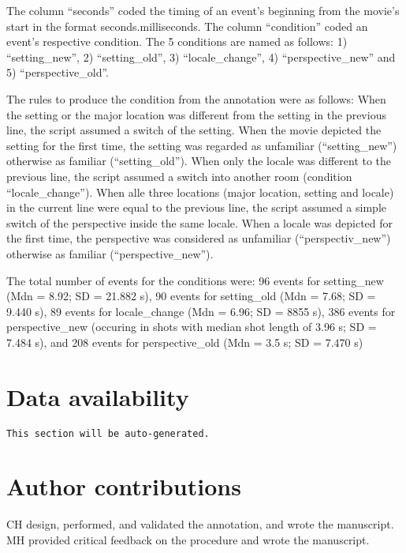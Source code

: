 \documentclass[10pt,a4paper,twocolumn]{article}
\begin{document}
The column ``seconds'' coded the timing of an event's beginning
from the movie's start in the format seconds.milliseconds. The column
``condition'' coded an event's respective condition. The 5 conditions
are named as follows: 1) ``setting\_new'', 2) ``setting\_old'',
3) ``locale\_change'', 4) ``perspective\_new'' and 5) ``perspective\_old''. 

The rules to produce the condition from the annotation were as follows:
When the setting or the major location was different from the setting
in the previous line, the script assumed a switch of the setting.
When the movie depicted the setting for the first time, the setting
was regarded as unfamiliar (``setting\_new'') otherwise as familiar
(``setting\_old''). When only the locale was different to the previous
line, the script assumed a switch into another room (condition ``locale\_change'').
When alle three locations (major location, setting and locale) in
the current line were equal to the previous line, the script assumed
a simple switch of the perspective inside the same locale. When a
locale was depicted for the first time, the perspective was considered
as unfamiliar (``perspectiv\_new'') otherwise as familiar (``perspective\_new''). 

The total number of events for the conditions were: 96 events for
setting\_new (Mdn = 8.92; SD = 21.882 s), 90 events for setting\_old
(Mdn = 7.68; SD = 9.440 s), 89 events for locale\_change (Mdn = 6.96;
SD = 8855 s), 386 events for perspective\_new (occuring in shots with
median shot length of 3.96 s; SD = 7.484 s), and 208 events for perspective\_old
(Mdn = 3.5 s; SD = 7.470 s)


\section*{Data availability}

\texttt{This section will be auto-generated.}


\section*{Author contributions}
CH design, performed, and validated the annotation, and wrote the manuscript.
MH provided critical feedback on the procedure and wrote the manuscript.
\end{document}
